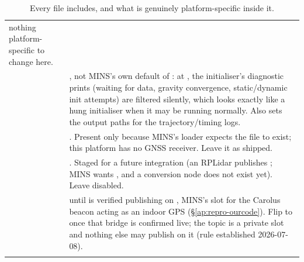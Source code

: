\begin{center}
\begin{longtable}{@{}L{2.9cm}L{9.9cm}@{}}
  nothing platform-specific to change here. \\
 & , not MINS's own default of
  : at , the initialiser's diagnostic prints (waiting for
  data, gravity convergence, static/dynamic init attempts) are filtered
  silently, which looks exactly like a hung initialiser when it may be
  running normally. Also sets the output paths for the trajectory/timing
  logs. \\
 & . Present only because MINS's
  loader expects the file to exist; this platform has no GNSS receiver.
  Leave it as shipped. \\
 & . Staged for a future
  integration (an RPLidar publishes ; MINS wants
  , and a conversion node does not exist yet). Leave
  disabled. \\
 &  until
   is verified publishing on
  , MINS's slot for the Carolus beacon
  acting as an indoor GPS (\S\ref{ap:repro-ourcode}). Flip to 
  once that bridge is confirmed live; the topic is a private slot and
  nothing else may publish on it (rule established 2026-07-08). \\
\bottomrule
\caption{Every file  includes, and what is genuinely
platform-specific inside it.}
\label{tab:minsconfigfiles}
\end{longtable}
\end{center}

